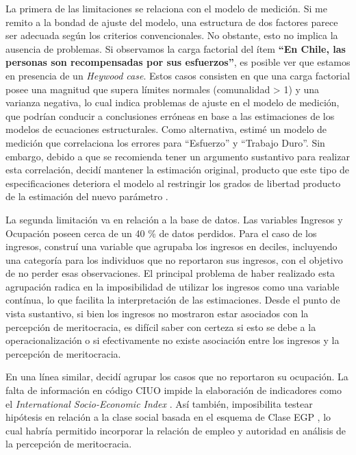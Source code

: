 \documentclass[12pt]{article}
\begin{document}
La primera de las limitaciones se relaciona con el modelo de medición. Si me remito a la bondad de ajuste del modelo, una estructura de dos factores parece ser adecuada según los criterios convencionales. No obstante, esto no implica la ausencia de problemas. Si observamos la carga factorial del ítem \textbf{``En Chile, las personas son recompensadas por sus esfuerzos''}, es posible ver que estamos en presencia de un \textit{Heywood case}. Estos casos consisten en que una carga factorial posee una magnitud que supera límites normales (comunalidad > 1) y una varianza negativa, lo cual indica problemas de ajuste en el modelo de medición, que podrían conducir a conclusiones erróneas en base a las estimaciones de los modelos de ecuaciones estructurales. Como alternativa, estimé un modelo de medición que correlaciona los errores para ``Esfuerzo'' y ``Trabajo Duro''. Sin embargo, debido a que se recomienda tener un argumento sustantivo para realizar esta correlación, decidí mantener la estimación original, producto que este tipo de especificaciones deteriora el modelo al restringir los grados de libertad producto de la estimación del nuevo parámetro \citep{Brown2008}.

La segunda limitación va en relación a la base de datos. Las variables Ingresos y Ocupación poseen cerca de un 40 \% de datos perdidos. Para el caso de los ingresos, construí una variable que agrupaba los ingresos en deciles, incluyendo una categoría para los individuos que no reportaron sus ingresos, con el objetivo de no perder esas observaciones. El principal problema de haber realizado esta agrupación radica en la imposibilidad de utilizar los ingresos como una variable contínua, lo que facilita la interpretación de las estimaciones. Desde el punto de vista sustantivo, si bien los ingresos no mostraron estar asociados con la percepción de meritocracia, es difícil saber con certeza si esto se debe a la operacionalización o si efectivamente no existe asociación entre los ingresos y la percepción de meritocracia. 

En una línea similar, decidí agrupar los casos que no reportaron su ocupación. La falta de información en código CIUO impide la elaboración de indicadores como el \textit{International Socio-Economic Index} \citep{Ganzeboom1992}. Así también, imposibilita testear hipótesis en relación a la clase social basada en el esquema de Clase EGP \citep{Erikson1979}, lo cual habría permitido incorporar la relación de empleo y autoridad en análisis de la percepción de meritocracia.      
\end{document}
